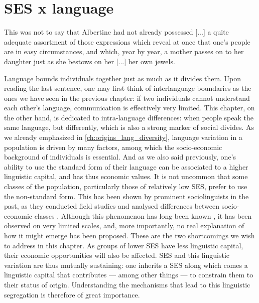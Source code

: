 \documentclass[../thesis.tex]{subfiles}
\begin{document}
\chapter{SES x language}
\label{ch:ses_ling}

\epigraph{
  This was not to say that Albertine had not already possessed [...] a quite
  adequate assortment  of those expressions which reveal at once that one's people are
  in easy circumstances, and which, year by year, a mother passes on to her daughter
  just as she bestows on her [...]
  her own jewels.
}{
}

Language bounds individuals together just as much as it divides them. Upon reading the
last sentence, one may first think of interlanguage boundaries as the ones we have seen
in the previous chapter: if two individuals cannot understand each other's language,
communication is effectively very limited. This chapter, on the other hand, is dedicated
to intra-language differences: when people speak the same language, but differently,
which is also a strong marker of social divides. As we already emphasized in
\cref{ch:origins_lang_diversity}, language variation in a population is driven by many
factors, among which the socio-economic background of individuals is essential. And as
we also said previously, one's ability to use the standard form of their language can be
associated to a higher linguistic capital, and has thus economic values. It is not
uncommon that some classes of the population, particularly those of relatively low
\ac{SES}, prefer to use the non-standard form. This has been shown by prominent
sociolinguists in the past, as they conducted field studies and analysed differences
between socio-economic classes
\cite{LabovSocialStratification1966,TrudgillSocialDifferentiation1974}. Although this
phenomenon has long been known \cite{ChambersSociolinguisticTheory2007}, it has been
observed on very limited scales, and, more importantly, no real explanation of how it
might emerge has been proposed. These are the two shortcomings we wish to address in
this chapter. As groups of lower \ac{SES} have less linguistic capital, their economic
opportunities will also be affected. \Ac{SES} and this linguistic variation are thus
mutually sustaining: one inherits a \ac{SES} along which comes a linguistic capital that
contributes --- among other things --- to constrain them to their status of origin.
Understanding the mechanisms that lead to this linguistic segregation is therefore of
great importance. 
\end{document}
